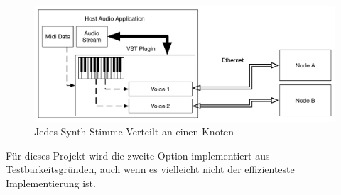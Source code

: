 \begin{figure}[H]
    \centering
    \includegraphics[width=\textwidth]{assets/distribute_byvoice.pdf}
    \caption{Jedes Synth Stimme Verteilt an einen Knoten}
    \label{fig:pervoice}
\end{figure}

Für dieses Projekt wird die zweite Option implementiert aus Testbarkeitsgründen, auch wenn es vielleicht nicht der effizienteste Implementierung ist.